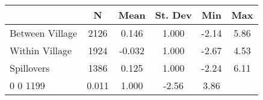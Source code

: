 \begin{tabular}{l*{5}{c}}\hline&\multicolumn{1}{c}{N}&\multicolumn{1}{c}{Mean}&\multicolumn{1}{c}{St. Dev}&\multicolumn{1}{c}{Min}&\multicolumn{1}{c}{Max}\\ \hline 
Between Village & 2126 & 0.146 & 1.000 & -2.14 & 5.86 \\
Within Village & 1924 & -0.032 & 1.000 & -2.67 & 4.53 \\
Spillovers & 1386 & 0.125 & 1.000 & -2.24 & 6.11 \\
0 0 1199 & 0.011 & 1.000 & -2.56 & 3.86 \\
\hline \end{tabular}
